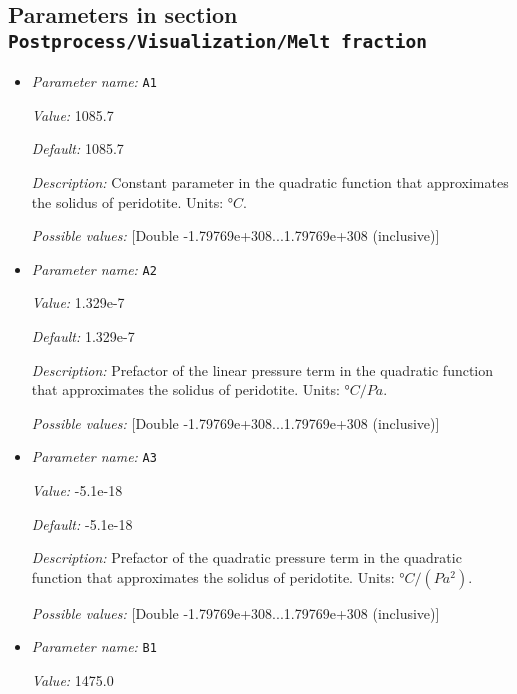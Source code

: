\subsection{Parameters in section \tt Postprocess/Visualization/Melt fraction}
\label{parameters:Postprocess/Visualization/Melt_20fraction}

\begin{itemize}
\item {\it Parameter name:} {\tt A1}
\label{parameters:Postprocess/Visualization/Melt fraction/A1}


{\it Value:} 1085.7


{\it Default:} 1085.7


{\it Description:} Constant parameter in the quadratic function that approximates the solidus of peridotite. Units: $°C$.


{\it Possible values:} [Double -1.79769e+308...1.79769e+308 (inclusive)]
\item {\it Parameter name:} {\tt A2}
\label{parameters:Postprocess/Visualization/Melt fraction/A2}


{\it Value:} 1.329e-7


{\it Default:} 1.329e-7


{\it Description:} Prefactor of the linear pressure term in the quadratic function that approximates the solidus of peridotite. Units: $°C/Pa$.


{\it Possible values:} [Double -1.79769e+308...1.79769e+308 (inclusive)]
\item {\it Parameter name:} {\tt A3}
\label{parameters:Postprocess/Visualization/Melt fraction/A3}


{\it Value:} -5.1e-18


{\it Default:} -5.1e-18


{\it Description:} Prefactor of the quadratic pressure term in the quadratic function that approximates the solidus of peridotite. Units: $°C/(Pa^2)$.


{\it Possible values:} [Double -1.79769e+308...1.79769e+308 (inclusive)]
\item {\it Parameter name:} {\tt B1}
\label{parameters:Postprocess/Visualization/Melt fraction/B1}


{\it Value:} 1475.0



\end{itemize}

